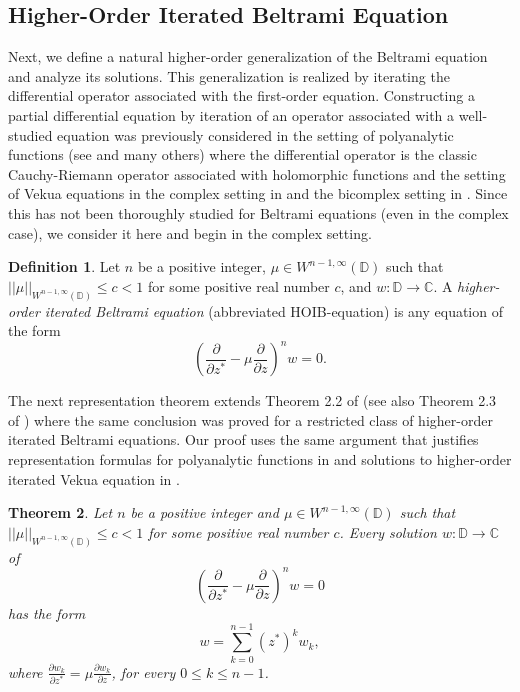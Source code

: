 \documentclass[12pt,reqno]{amsart}
\newtheorem{theorem}{Theorem}[section]
\theoremstyle{definition}
\newtheorem{deff}[theorem]{Definition}
\theoremstyle{remark}
\newcommand{\C}{\mathbb C}
\newcommand{\p}{\partial}
\newcommand{\disk}{\mathbb{D}}
\begin{document}
\subsection{Higher-Order Iterated Beltrami Equation}

Next, we define a natural higher-order generalization of the Beltrami equation and analyze its solutions. This generalization is realized by iterating the differential operator associated with the first-order equation. Constructing a partial differential equation by iteration of an operator associated with a well-studied equation was previously considered in the setting of polyanalytic functions (see \cite{Balk} and many others) where the differential operator is the classic Cauchy-Riemann operator associated with holomorphic functions and the setting of Vekua equations in the complex setting in \cite{itvek, itvekbvp, Pascali, metahardy, WB3, WBD} and the bicomplex setting in \cite{BCHoiv}. Since this has not been thoroughly studied for Beltrami equations (even in the complex case), we consider it here and begin in the complex setting. 

\begin{deff}
     Let $n$ be a positive integer, $\mu \in W^{n-1,\infty}(\disk)$ such that $||\mu||_{W^{n-1,\infty}(\disk)}\leq c < 1$ for some positive real number $c$, and $w : \disk\to\C$. A \textit{higher-order iterated Beltrami equation} (abbreviated HOIB-equation) is any equation of the form
     \[
        \left( \frac{\p }{\p z^*} - \mu\frac{\p}{\p z} \right)^n w  = 0.
     \]
\end{deff}

The next representation theorem extends Theorem 2.2 of \cite{GuoJinDangDu} (see also Theorem 2.3 of \cite{GuoZhang}) where the same conclusion was proved for a restricted class of higher-order iterated Beltrami equations. Our proof uses the same argument that justifies representation formulas for polyanalytic functions in \cite{Balk} and solutions to higher-order iterated Vekua equation in \cite{WBD}. 

\begin{theorem}\label{thm: hoibimpliesbel}
    Let $n$ be a positive integer and $\mu \in W^{n-1,\infty}(\disk)$ such that $||\mu||_{W^{n-1,\infty}(\disk)}\leq c < 1$ for some positive real number $c$. Every solution $w : \disk \to\C$ of 
    \begin{equation}\label{higherbeltramiequation}
        \left( \frac{\p }{\p z^*} - \mu\frac{\p}{\p z} \right)^n w  = 0
    \end{equation}
    has the form 
    \begin{equation}\label{higherbeltramirep}
        w = \sum_{k=0}^{n-1}  (z^*)^k w_k,
    \end{equation}
    where $\frac{\p w_k}{\p  z^*} = \mu \frac{\p w_k}{\p z}$, for every $0 \leq k \leq n-1$. 
\end{theorem}
\end{document}

